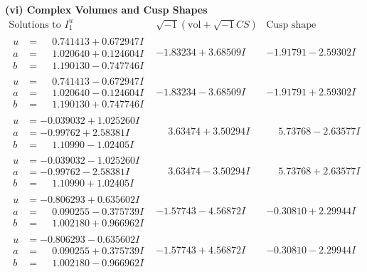 \documentclass[1p]{elsarticle_modified}
\theoremstyle{definition}
\newcommand{\I}{\sqrt{-1}}
\begin{document}
\newpage\flushleft \textbf{(vi) Complex Volumes and Cusp Shapes}
$$\begin{array}{c|c|c}  
\text{Solutions to }I^u_{1}& \I (\text{vol} + \sqrt{-1}CS) & \text{Cusp shape}\\
 \hline 
\begin{aligned}
u &= \phantom{-}0.741413 + 0.672947 I \\
a &= \phantom{-}1.020640 + 0.124604 I \\
b &= \phantom{-}1.190130 - 0.747746 I\end{aligned}
 & -1.83234 + 3.68509 I & -1.91791 - 2.59302 I \\ \hline\begin{aligned}
u &= \phantom{-}0.741413 - 0.672947 I \\
a &= \phantom{-}1.020640 - 0.124604 I \\
b &= \phantom{-}1.190130 + 0.747746 I\end{aligned}
 & -1.83234 - 3.68509 I & -1.91791 + 2.59302 I \\ \hline\begin{aligned}
u &= -0.039032 + 1.025260 I \\
a &= -0.99762 + 2.58381 I \\
b &= \phantom{-}1.10990 - 1.02405 I\end{aligned}
 & \phantom{-}3.63474 + 3.50294 I & \phantom{-}5.73768 - 2.63577 I \\ \hline\begin{aligned}
u &= -0.039032 - 1.025260 I \\
a &= -0.99762 - 2.58381 I \\
b &= \phantom{-}1.10990 + 1.02405 I\end{aligned}
 & \phantom{-}3.63474 - 3.50294 I & \phantom{-}5.73768 + 2.63577 I \\ \hline\begin{aligned}
u &= -0.806293 + 0.635602 I \\
a &= \phantom{-}0.090255 - 0.375739 I \\
b &= \phantom{-}1.002180 + 0.966962 I\end{aligned}
 & -1.57743 - 4.56872 I & -0.30810 + 2.29944 I \\ \hline\begin{aligned}
u &= -0.806293 - 0.635602 I \\
a &= \phantom{-}0.090255 + 0.375739 I \\
b &= \phantom{-}1.002180 - 0.966962 I\end{aligned}
 & -1.57743 + 4.56872 I & -0.30810 - 2.29944 I \\ \hline\begin{aligned}

\end{aligned}
\end{array}$$
\end{document}
